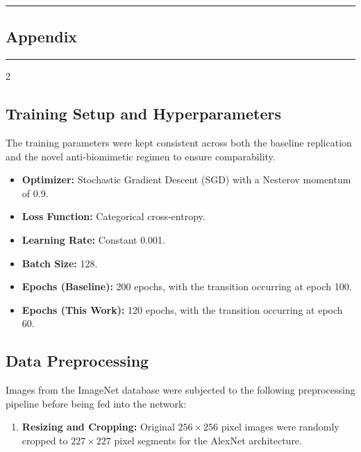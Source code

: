 {\color{gray}\hrule}
\begin{center}
\section{Appendix}
\bigskip
\end{center}
{\color{gray}\hrule}
\vspace{0.5cm}
\begin{multicols}{2}

\subsection{Training Setup and Hyperparameters}
\label{app:train_setup}

The training parameters were kept consistent across both the baseline replication and the novel anti-biomimetic regimen to ensure comparability.

\begin{itemize}
\item \textbf{Optimizer:} Stochastic Gradient Descent (SGD) with a Nesterov momentum of 0.9.

\item \textbf{Loss Function:} Categorical cross-entropy.

\item \textbf{Learning Rate:} Constant 0.001.

\item \textbf{Batch Size:} 128.

\item \textbf{Epochs (Baseline):} 200 epochs, with the transition occurring at epoch 100.

\item \textbf{Epochs (This Work):} 120 epochs, with the transition occurring at epoch 60.

\end{itemize}


\subsection{Data Preprocessing}
\label{app:data_preprocessing}

Images from the ImageNet database were subjected to the following preprocessing pipeline before being fed into the network:

\begin{enumerate}
\item \textbf{Resizing and Cropping:} Original $256 \times 256$ pixel images were randomly cropped to $227 \times 227$ pixel segments for the AlexNet architecture.


\end{enumerate}
\end{multicols}
